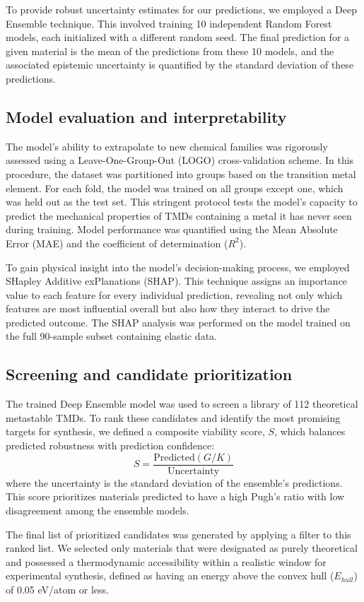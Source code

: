 \documentclass[]{article}
\begin{document}
To provide robust uncertainty estimates for our predictions, we employed a Deep Ensemble technique. This involved training 10 independent Random Forest models, each initialized with a different random seed. The final prediction for a given material is the mean of the predictions from these 10 models, and the associated epistemic uncertainty is quantified by the standard deviation of these predictions.

\subsection{Model evaluation and interpretability}
The model's ability to extrapolate to new chemical families was rigorously assessed using a Leave-One-Group-Out (LOGO) cross-validation scheme. In this procedure, the dataset was partitioned into groups based on the transition metal element. For each fold, the model was trained on all groups except one, which was held out as the test set. This stringent protocol tests the model's capacity to predict the mechanical properties of TMDs containing a metal it has never seen during training. Model performance was quantified using the Mean Absolute Error (MAE) and the coefficient of determination ($R^2$).

To gain physical insight into the model's decision-making process, we employed SHapley Additive exPlanations (SHAP). This technique assigns an importance value to each feature for every individual prediction, revealing not only which features are most influential overall but also how they interact to drive the predicted outcome. The SHAP analysis was performed on the model trained on the full 90-sample subset containing elastic data.

\subsection{Screening and candidate prioritization}
The trained Deep Ensemble model was used to screen a library of 112 theoretical metastable TMDs. To rank these candidates and identify the most promising targets for synthesis, we defined a composite viability score, $S$, which balances predicted robustness with prediction confidence:
\begin{equation}
S = \frac{\text{Predicted}(G/K)}{\text{Uncertainty}}
\end{equation}
where the uncertainty is the standard deviation of the ensemble's predictions. This score prioritizes materials predicted to have a high Pugh's ratio with low disagreement among the ensemble models.

The final list of prioritized candidates was generated by applying a filter to this ranked list. We selected only materials that were designated as purely theoretical and possessed a thermodynamic accessibility within a realistic window for experimental synthesis, defined as having an energy above the convex hull ($E_{hull}$) of 0.05 eV/atom or less.
\end{document}
